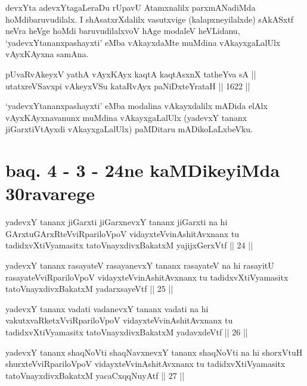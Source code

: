 \begin{artha}
devxYta adevxYtagaLeraDu rUpavU Atamxnalilx parxmANadiMda hoMdibaruvudilalx. I shAsatxrXdalilx vasutxvige (kalapxneyilalxde) sAkASxtf neVra heVge hoMdi baruvudilalxvoV hAge modaleV heVLidanu, `yadevxYtananxpashayxti' eMba vAkayxdaMte muMdina vAkayxgaLalUlx vAyxKAyxna samAna.
\end{artha}

\begin{shl}
pUvaRvAkeyxV yathA vAyxKAyx kaqtA kaqtAsxnX tatheYva sA || \\
utatxreVSavxpi vAkeyxVSu kataRvAyx paNiDxteYrataH \hfill || 1622 ||  
\end{shl}

\begin{artha}
`yadevxYtananxpashayxti' eMba modalina vAkayxdalilx mADida elAlx vAyxKAyxnavanunx muMdina vAkayxgaLalUlx (yadevxY tananx jiGarxtiVtAyxdi vAkayxgaLalUlx) paMDitaru mADikoLaLxbeVku.  
\end{artha}

\section*{baq. 4 - 3 - 24ne kaMDikeyiMda 30ravarege}

\begin{shl}
yadevxY tananx jiGarxti jiGarxnevxY tananx jiGarxti na hi GArxtuGArxRteVviRpariloVpoV vidayxteV\s vinAshitAvxnanx tu tadidxvXtiVyamasitx tatoV\s nayxdivxBakatxM yajijxGerxVtf || 24 ||
\end{shl}

\begin{shl}
yadevxY tananx rasayateV rasayanevxY tananx rasayateV na hi rasayitU rasayateVviRpariloVpoV vidayxteV\s vinAshitAvxnanx tu tadidxvXtiVyamasitx tatoV\s nayxdivxBakatxM yadarxsayeVtf || 25 ||
\end{shl}

\begin{shl}
yadevxY tananx vadati vadanevxY tananx vadati na hi vakutxvaRketxVviRpariloVpoV vidayxteV\s vinAshitAvxnanx tu tadidxvXtiVyamasitx tatoV\s nayxdivxBakatxM yadavxdeVtf || 26 ||
\end{shl}

\begin{shl}
yadevxY tananx shaqNoVti shaqNavxnevxY tananx shaqNoVti na hi shorxVtuH shurxteVviRpariloVpoV vidayxteV\s vinAshitAvxnanx tu tadidxvXtiVyamasitx tatoV\s nayxdivxBakatxM yacaCxqqNuyAtf || 27 ||
\end{shl}

